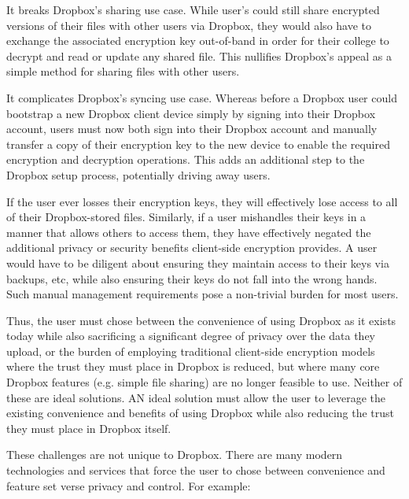 \begin{packed_enum}
\item It breaks Dropbox's sharing use case. While user's could still
  share encrypted versions of their files with other users via
  Dropbox, they would also have to exchange the associated encryption
  key out-of-band in order for their college to decrypt and read or
  update any shared file. This nullifies Dropbox's appeal as a simple
  method for sharing files with other users.
\item It complicates Dropbox's syncing use case. Whereas before a
  Dropbox user could bootstrap a new Dropbox client device simply by
  signing into their Dropbox account, users must now both sign into
  their Dropbox account and manually transfer a copy of their
  encryption key to the new device to enable the required encryption
  and decryption operations. This adds an additional step to the
  Dropbox setup process, potentially driving away users.
\item If the user ever losses their encryption keys, they will
  effectively lose access to all of their Dropbox-stored
  files. Similarly, if a user mishandles their keys in a manner that
  allows others to access them, they have effectively negated the
  additional privacy or security benefits client-side encryption
  provides. A user would have to be diligent about ensuring they
  maintain access to their keys via backups, etc, while also ensuring
  their keys do not fall into the wrong hands. Such manual management
  requirements pose a non-trivial burden for most users.
\end{packed_enum}

Thus, the user must chose between the convenience of using Dropbox as
it exists today while also sacrificing a significant degree of privacy
over the data they upload, or the burden of employing traditional
client-side encryption models where the trust they must place in
Dropbox is reduced, but where many core Dropbox features (e.g. simple
file sharing) are no longer feasible to use. Neither of these are
ideal solutions. AN ideal solution must allow the user to leverage the
existing convenience and benefits of using Dropbox while also reducing
the trust they must place in Dropbox itself.

These challenges are not unique to Dropbox. There are many modern
technologies and services that force the user to chose between
convenience and feature set verse privacy and control. For example:

